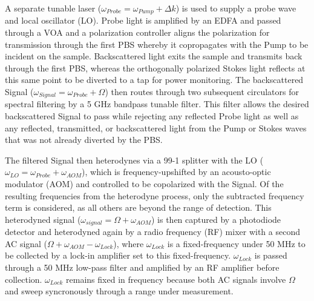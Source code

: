 \documentclass[%
  reprint,
  superscriptaddress,
  amsmath,amssymb,
  aps,
  prapplied,
]{revtex4-2}
\begin{document}
A separate tunable laser ($\omega_{Probe} = \omega_{Pump} + \Delta k$) is used to supply a probe wave and local oscillator (LO). Probe light is amplified by an EDFA and passed through a VOA and a polarization controller aligns the polarization for transmission through the first PBS whereby it copropagates with the Pump to be incident on the sample. Backscattered light exits the sample and transmits back through the first PBS, whereas the orthogonally polarized Stokes light reflects at this same point to be diverted to a tap for power monitoring. The backscattered Signal ($\omega_{Signal} = \omega_{Probe} + \Omega$) then routes through two subsequent circulators for spectral filtering by a 5 GHz bandpass tunable filter. This filter allows the desired backscattered Signal to pass while rejecting any reflected Probe light as well as any reflected, transmitted, or backscattered light from the Pump or Stokes waves that was not already diverted by the PBS.

The filtered Signal then heterodynes via a 99-1 splitter with the LO ($\omega_{LO} = \omega_{Probe} + \omega_{AOM}$), which is frequency-upshifted by an acousto-optic modulator (AOM) and controlled to be copolarized with the Signal. Of the resulting frequencies from the heterodyne process, only the subtracted frequency term is considered, as all others are beyond the range of detection. This heterodyned signal ($\omega_{signal} = \Omega + \omega_{AOM}$) is then captured by a photodiode detector and heterodyned again by a radio frequency (RF) mixer with a second AC signal ($\Omega + \omega_{AOM} - \omega_{Lock}$), where $\omega_{Lock}$ is a fixed-frequency under 50 MHz to be collected by a lock-in amplifier set to this fixed-frequency. $\omega_{Lock}$ is passed through a 50 MHz low-pass filter and amplified by an RF amplifier before collection. $\omega_{Lock}$ remains fixed in frequency because both AC signals involve $\Omega$ and sweep syncronously through a range under measurement.
\end{document}
